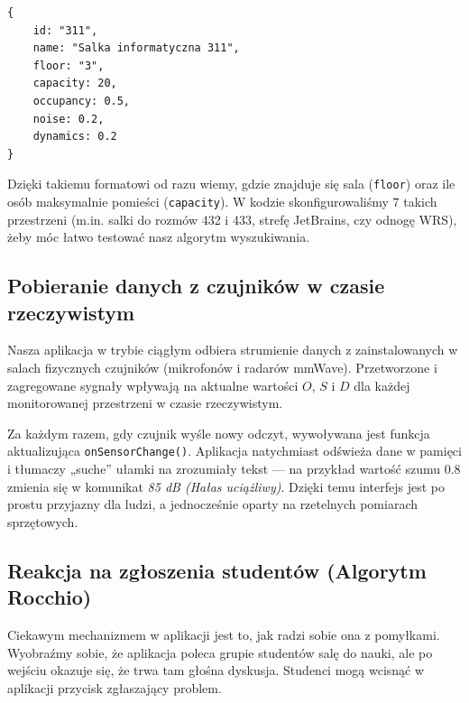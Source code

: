 \documentclass[14pt,a4paper]{extarticle}
\begin{document}
\begin{verbatim}
{
    id: "311",
    name: "Salka informatyczna 311",
    floor: "3",
    capacity: 20,
    occupancy: 0.5,
    noise: 0.2,
    dynamics: 0.2
}
\end{verbatim}

Dzięki takiemu formatowi od razu wiemy, gdzie znajduje się sala (\texttt{floor}) oraz ile osób maksymalnie pomieści (\texttt{capacity}). W kodzie skonfigurowaliśmy $7$ takich przestrzeni (m.in. salki do rozmów 432 i 433, strefę JetBrains, czy odnogę WRS), żeby móc łatwo testować nasz algorytm wyszukiwania.

\subsection{Pobieranie danych z czujników w czasie rzeczywistym}
Nasza aplikacja w trybie ciągłym odbiera strumienie danych z zainstalowanych w salach fizycznych czujników (mikrofonów i radarów mmWave). Przetworzone i zagregowane sygnały wpływają na aktualne wartości $O$, $S$ i $D$ dla każdej monitorowanej przestrzeni w czasie rzeczywistym.

Za każdym razem, gdy czujnik wyśle nowy odczyt, wywoływana jest funkcja aktualizująca \texttt{onSensorChange()}. Aplikacja natychmiast odświeża dane w pamięci i tłumaczy „suche” ułamki na zrozumiały tekst --- na przykład wartość szumu $0.8$ zmienia się w komunikat \emph{85 dB (Hałas uciążliwy)}. Dzięki temu interfejs jest po prostu przyjazny dla ludzi, a jednocześnie oparty na rzetelnych pomiarach sprzętowych.

\subsection{Reakcja na zgłoszenia studentów (Algorytm Rocchio)}
Ciekawym mechanizmem w aplikacji jest to, jak radzi sobie ona z pomyłkami. Wyobraźmy sobie, że aplikacja poleca grupie studentów salę do nauki, ale po wejściu okazuje się, że trwa tam głośna dyskusja. Studenci mogą wcisnąć w aplikacji przycisk zgłaszający problem. 
\end{document}
